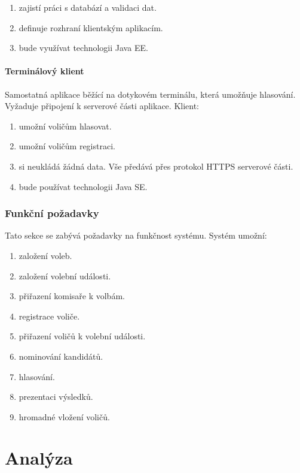 \documentclass[11pt,twoside,a4paper]{book}
\begin{document}
\begin{enumerate}
	\item zajistí práci s databází a validaci dat.
	\item definuje rozhraní klientským aplikacím.
	\item bude využívat technologii Java EE.
\end{enumerate}

\subsubsection{Terminálový klient}

Samostatná aplikace běžící na dotykovém terminálu, která umožňuje hlasování. Vyžaduje připojení k serverové části aplikace. Klient:

\begin{enumerate}
	\item umožní voličům hlasovat.
	\item umožní voličům registraci.
	\item si neukládá žádná data. Vše předává přes protokol HTTPS serverové části. 
	\item bude používat technologii Java SE.
\end{enumerate}

\subsection{Funkční požadavky}

Tato sekce se zabývá požadavky na funkčnost systému. Systém umožní:

\begin{enumerate}
	\item založení voleb.
	\item založení volební události.
	\item přiřazení komisaře k volbám.
	\item registrace voliče.
	\item přiřazení voličů k volební události.
	\item nominování kandidátů.
	\item hlasování.
	\item prezentaci výsledků.
	\item hromadné vložení voličů.
\end{enumerate}

\chapter{Analýza}
\end{document}
